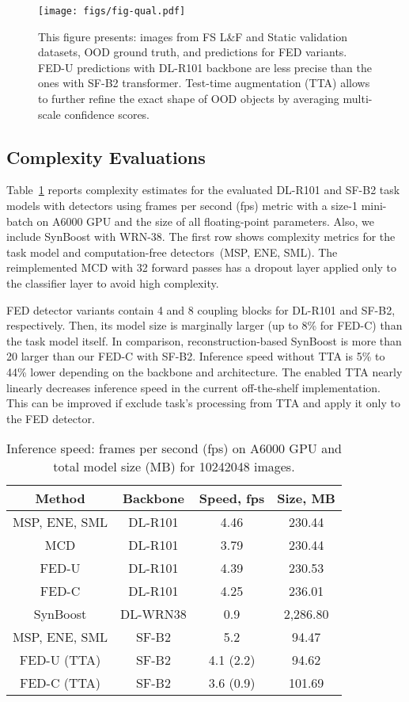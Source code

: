 \documentclass[accepted, startpage]{uai2023}
\begin{document}
\begin{figure*}[ht]
	\centering
	\texttt{[image: figs/fig-qual.pdf]}
	\caption{This figure presents: images from FS L\&F and Static validation datasets, OOD ground truth, and predictions for FED variants. FED-U predictions with DL-R101 backbone are less precise than the ones with SF-B2 transformer. Test-time augmentation (TTA) allows to further refine the exact shape of OOD objects by averaging multi-scale confidence scores.}
	\label{fig:qual}
\end{figure*}

\subsection{Complexity Evaluations}
\label{sec:comp_eval}
Table~\ref{tab:complexity-results} reports complexity estimates for the evaluated DL-R101 and SF-B2 task models with detectors using frames per second (fps) metric with a size-1 mini-batch on A6000 GPU and the size of all floating-point parameters. Also, we include SynBoost with WRN-38. The first row shows complexity metrics for the task model and computation-free detectors~(MSP, ENE, SML). The reimplemented MCD with 32 forward passes has a dropout layer applied only to the classifier layer to avoid high complexity.

FED detector variants contain 4 and 8 coupling blocks for DL-R101 and SF-B2, respectively. Then, its model size is marginally larger (up to 8\% for FED-C) than the task model itself. In comparison, reconstruction-based SynBoost is more than 20 larger than our FED-C with SF-B2. Inference speed without TTA is 5\% to 44\% lower depending on the backbone and architecture. The enabled TTA nearly linearly decreases inference speed in the current off-the-shelf implementation. This can be improved if exclude task's processing from TTA and apply it only to the FED detector.

\begin{table}[ht]
	\caption{Inference speed: frames per second (fps) on A6000 GPU and total model size (MB) for 10242048 images.}
	\label{tab:complexity-results}
	\centering
	\small
	\begin{tabular}{c|c|c|c}
		\toprule
		Method & Backbone & Speed, fps & Size, MB \\
		\midrule
		MSP, ENE, SML & DL-R101 & 4.46 & 230.44 \\
		MCD & DL-R101 & 3.79 & 230.44 \\
		FED-U   & DL-R101 & 4.39 & 230.53 \\
		FED-C   & DL-R101 & 4.25 & 236.01 \\
		\midrule
		SynBoost & DL-WRN38 & 0.9 & 2,286.80 \\
		MSP, ENE, SML & SF-B2 & 5.2 & 94.47 \\
		FED-U (TTA)  & SF-B2 & 4.1 (2.2) & 94.62 \\
		FED-C (TTA)  & SF-B2 & 3.6 (0.9) & 101.69 \\
		\bottomrule
	\end{tabular}
\end{table}
\end{document}
